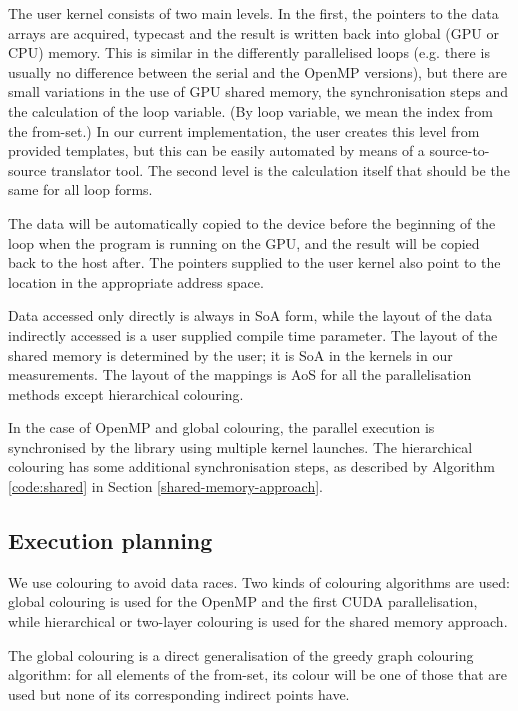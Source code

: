 The user kernel consists of two main levels. In the first, the pointers to the
data arrays are acquired, typecast and the result is written back into global
(GPU or CPU) memory. This is similar in the differently parallelised loops (e.g.
there is usually no difference between the serial and the OpenMP versions), but
there are small variations in the use of GPU shared memory, the synchronisation
steps and the calculation of the loop variable. (By loop variable, we mean the
index from the from-set.) In our current implementation, the user creates this
level from provided templates, but this can be easily automated by means of a
source-to-source translator tool. The second level is the calculation itself
that should be the same for all loop forms.

The data will be automatically copied to the device before the beginning of the
loop when the program is running on the GPU, and the result will be copied back
to the host after. The pointers supplied to the user kernel also point to the
location in the appropriate address space.

Data accessed only directly is always in SoA form, while the layout of the
data indirectly accessed is a user supplied compile time parameter. The layout
of the shared memory is determined by the user; it is SoA in the kernels in our
measurements. The layout of the mappings is AoS for all the parallelisation
methods except hierarchical colouring.

In the case of OpenMP and global colouring, the parallel execution is
synchronised by the library using multiple kernel launches. The hierarchical
colouring has some additional synchronisation steps, as described by Algorithm
\ref{code:shared} in Section \ref{shared-memory-approach}.

\subsection{Execution planning}

We use colouring to avoid data races. Two kinds of colouring algorithms are
used: global colouring is used for the OpenMP and the first CUDA
parallelisation, while hierarchical or two-layer colouring is used for the
shared memory approach.

The global colouring is a direct generalisation of the greedy graph colouring
algorithm: for all elements of the from-set, its colour will be one of those
that are used but none of its corresponding indirect points have.

